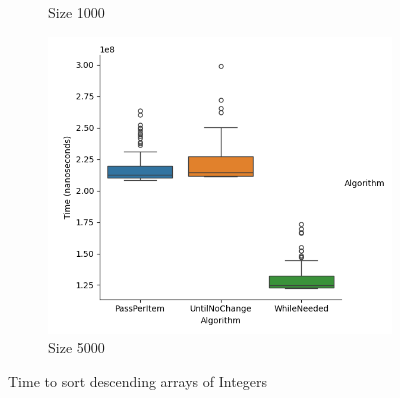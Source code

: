 \documentclass{article}
\begin{document}
\begin{figure}[ht]
\begin{subfigure}{0.3\textwidth}
    \caption{Size 1000}
    \label{fig:img2}
  \end{subfigure}
  \begin{subfigure}{0.3\textwidth}
    \centering
    \includegraphics[width=\linewidth]{../figureIntDesc5000.png}
    \caption{Size 5000}
    \label{fig:img3}
  \end{subfigure}
  \caption{Time to sort descending arrays of Integers}
  \label{fig:three_images}
\end{figure}
\end{document}
